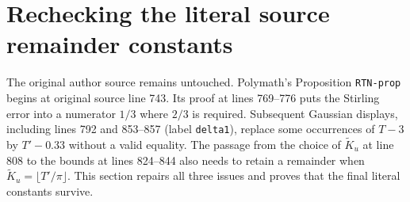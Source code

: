 \section{Rechecking the literal source remainder constants}
\label{sec:source-repair}

The original author source remains untouched. Polymath's Proposition
\texttt{RTN-prop} begins at original source line 743. Its proof at
lines 769--776 puts the Stirling error into a numerator $1/3$ where
$2/3$ is required. Subsequent Gaussian displays, including lines
792 and 853--857 (label \texttt{delta1}), replace some occurrences
of $T-3$ by $T'-0.33$ without a valid equality. The passage from
the choice of $\widetilde K_u$ at line 808 to the bounds at lines
824--844 also needs to retain a remainder when
$\widetilde K_u=\lfloor T'/\pi\rfloor$. This section repairs all
three issues and proves that the final literal constants survive.

